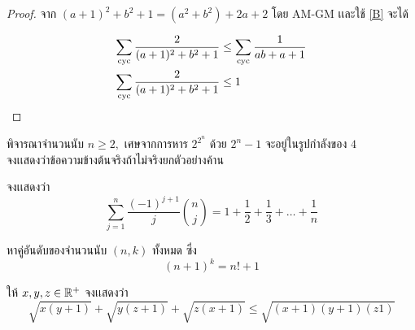 \documentclass[a4paper,12pt]{scrartcl}
\begin{document}
\begin{proof}
	
	จาก $(a + 1)^2 + b^2 + 1 = (a^2+b^2) + 2a + 2$ โดย AM-GM เเละใช้ \ref{B} จะได้
	
	\begin{align*}
		\sum_{\mathrm{cyc}} \frac{2}{(a + 1)^2 + b^2 + 1} &\le  \sum_{\mathrm{cyc}} \frac{1}{ab+a+1}\\
		\sum_{\mathrm{cyc}} \frac{2}{(a + 1)^2 + b^2 + 1} &\le 1
	\end{align*}

\end{proof}

\begin{example}
	
	พิจารณาจำนวนนับ $n \ge 2,$ เศษจากการหาร $2^{2^n}$ ด้วย $2^n - 1$  จะอยู่ในรูปกำลังของ $4$\\ จงเเสดงว่าข้อความข้างต้นจริงถ้าไม่จริงยกตัวอย่างค้าน 
	
\end{example}

\begin{example}
	
	จงเเสดงว่า \[ \sum_{j = 1}^{n} \frac{(-1)^{j+1}}{j} {n\choose j} = 1 + \frac{1}{2} + \frac{1}{3} + \dots +\frac{1}{n} \]

\end{example}

\begin{example}
	
	หาคู่อันดับของจำนวนนับ $(n , k)$ ทั้งหมด ซึ่ง \[ (n + 1)^k = n! + 1
	\]
	
\end{example}

\begin{example}
	
	ให้ $x , y , z \in \mathbb R^+$ จงเเสดงว่า \[ \sqrt{x(y + 1)} + \sqrt{y(z + 1)} + \sqrt{z(x + 1)} \le \sqrt{(x + 1)(y + 1)(z 1)} \]
	
\end{example}
\end{document}
